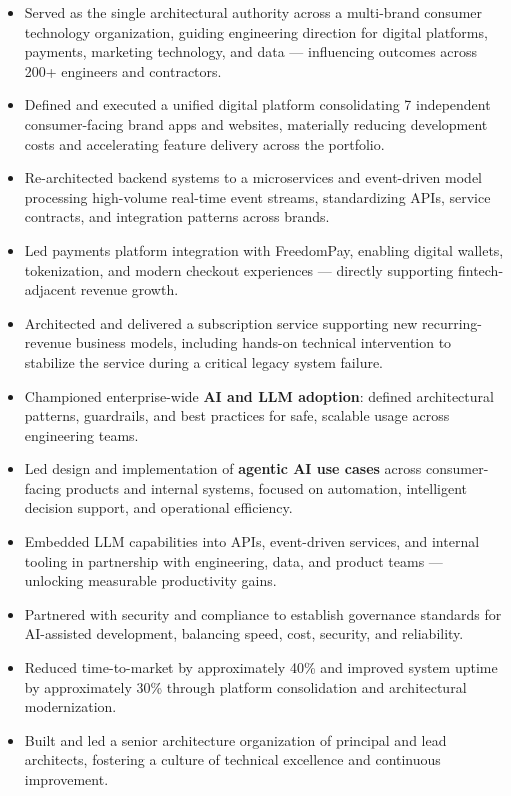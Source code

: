 \documentclass[11pt]{article}
\begin{document}
\begin{itemize}
  \item Served as the single architectural authority across a multi-brand consumer technology organization, guiding engineering direction for digital platforms, payments, marketing technology, and data --- influencing outcomes across 200+ engineers and contractors.
  \item Defined and executed a unified digital platform consolidating 7 independent consumer-facing brand apps and websites, materially reducing development costs and accelerating feature delivery across the portfolio.
  \item Re-architected backend systems to a microservices and event-driven model processing high-volume real-time event streams, standardizing APIs, service contracts, and integration patterns across brands.
  \item Led payments platform integration with FreedomPay, enabling digital wallets, tokenization, and modern checkout experiences --- directly supporting fintech-adjacent revenue growth.
  \item Architected and delivered a subscription service supporting new recurring-revenue business models, including hands-on technical intervention to stabilize the service during a critical legacy system failure.
  \item Championed enterprise-wide \textbf{AI and LLM adoption}: defined architectural patterns, guardrails, and best practices for safe, scalable usage across engineering teams.
  \item Led design and implementation of \textbf{agentic AI use cases} across consumer-facing products and internal systems, focused on automation, intelligent decision support, and operational efficiency.
  \item Embedded LLM capabilities into APIs, event-driven services, and internal tooling in partnership with engineering, data, and product teams --- unlocking measurable productivity gains.
  \item Partnered with security and compliance to establish governance standards for AI-assisted development, balancing speed, cost, security, and reliability.
  \item Reduced time-to-market by approximately 40\% and improved system uptime by approximately 30\% through platform consolidation and architectural modernization.
  \item Built and led a senior architecture organization of principal and lead architects, fostering a culture of technical excellence and continuous improvement.
\end{itemize}
\end{document}
